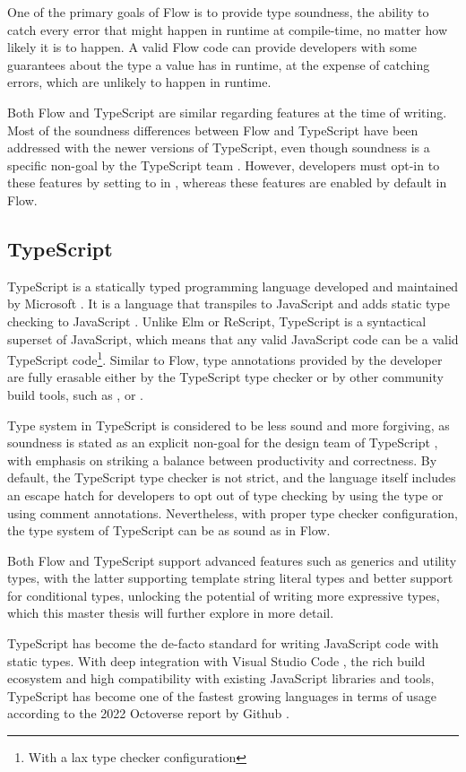 One of the primary goals of Flow is to provide type soundness, the ability to catch every error that might happen in runtime at compile-time, no matter how likely it is to happen. A valid Flow code can provide developers with some guarantees about the type a value has in runtime, at the expense of catching errors, which are unlikely to happen in runtime.

Both Flow and TypeScript are similar regarding features at the time of writing. Most of the soundness differences between Flow and TypeScript have been addressed with the newer versions of TypeScript, even though soundness is a specific non-goal by the TypeScript team \cite{TypeScriptDesignGoals}. However, developers must opt-in to these features by setting  to  in , whereas these features are enabled by default in Flow.

\subsection{TypeScript}

TypeScript is a statically typed programming language developed and maintained by Microsoft \cite{TypeScriptJavaScriptSyntax}. It is a language that transpiles to JavaScript and adds static type checking to JavaScript \cite{DocumentationTypeScriptJavaScript}. Unlike Elm or ReScript, TypeScript is a syntactical superset of JavaScript, which means that any valid JavaScript code can be a valid TypeScript code\footnote{With a lax type checker configuration}. Similar to Flow, type annotations provided by the developer are fully erasable either by the TypeScript  type checker or by other community build tools, such as \cite{BabelBabel2023}, \cite{EsbuildExtremelyFast} or \cite{SWCRustbasedPlatform}.

Type system in TypeScript is considered to be less sound and more forgiving, as soundness is stated as an explicit non-goal for the design team of TypeScript \cite{TypeScriptDesignGoals}, with emphasis on striking a balance between productivity and correctness. By default, the TypeScript type checker is not strict, and the language itself includes an escape hatch for developers to opt out of type checking by using the  type or using  comment annotations. Nevertheless, with proper type checker configuration, the type system of TypeScript can be as sound as in Flow.

Both Flow and TypeScript support advanced features such as generics and utility types, with the latter supporting template string literal types and better support for conditional types, unlocking the potential of writing more expressive types, which this master thesis will further explore in more detail.

TypeScript has become the de-facto standard for writing JavaScript code with static types. With deep integration with Visual Studio Code \cite{VisualStudioCode}, the rich build ecosystem and high compatibility with existing JavaScript libraries and tools, TypeScript has become one of the fastest growing languages in terms of usage according to the 2022 Octoverse report by Github \cite{Octoverse2022State}.
